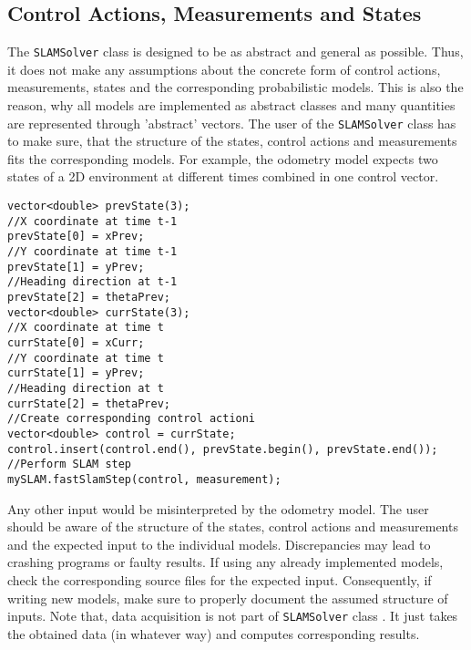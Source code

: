 \documentclass{article}
\newcommand{\SLAM}{\texttt{SLAMSolver} class }
\begin{document}
\subsection{Control Actions, Measurements and States}
The \SLAM is designed to be as abstract and general as possible. Thus, it does not make any assumptions about the concrete form of control actions, measurements, states and the corresponding probabilistic models. This is also the reason, why all models are implemented as abstract classes and many quantities are represented through 'abstract' vectors. The user of the \SLAM has to make sure, that the structure of the states, control actions and measurements fits the corresponding models. For example, the odometry model expects two states of a 2D environment at different times combined in one control vector.
\begin{lstlisting}
vector<double> prevState(3);
//X coordinate at time t-1
prevState[0] = xPrev;
//Y coordinate at time t-1
prevState[1] = yPrev;
//Heading direction at t-1
prevState[2] = thetaPrev;
vector<double> currState(3);
//X coordinate at time t
currState[0] = xCurr;
//Y coordinate at time t
currState[1] = yPrev;
//Heading direction at t
currState[2] = thetaPrev;
//Create corresponding control actioni
vector<double> control = currState;
control.insert(control.end(), prevState.begin(), prevState.end());
//Perform SLAM step
mySLAM.fastSlamStep(control, measurement);
\end{lstlisting}
Any other input would be misinterpreted by the odometry model. The user should be aware of the structure of the states, control actions and measurements and the expected input to the individual models. Discrepancies may lead to crashing programs or faulty results. If using any already implemented models, check the corresponding source files for the expected input. Consequently, if writing new models, make sure to properly document the assumed structure of inputs. Note that, data acquisition is not part of \SLAM. It just takes the obtained data (in whatever way) and computes corresponding results. 
\newpage
\end{document}
